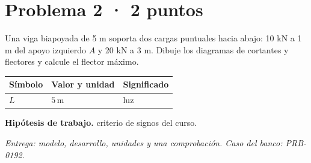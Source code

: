 \par\medskip\noindent\begin{minipage}{\linewidth}

\section{Problema 2 · 2 puntos}

Una viga biapoyada de 5 m soporta dos cargas puntuales hacia abajo: 10 kN a 1 m del apoyo izquierdo $A$ y 20 kN a 3 m. Dibuje los diagramas de cortantes y flectores y calcule el flector máximo.

\par\medskip\noindent\begin{tabular}{@{}p{.18\linewidth}p{.26\linewidth}p{.48\linewidth}@{}}
\toprule Símbolo & Valor y unidad & Significado\\\midrule
$L$ & $5\,\mathrm{m}$ & luz\\
\bottomrule\end{tabular}\par\medskip



\par\textbf{Hipótesis de trabajo.} criterio de signos del curso.

\par\textit{Entrega: modelo, desarrollo, unidades y una comprobación. Caso del banco: PRB-0192.}\end{minipage}\par\medskip

